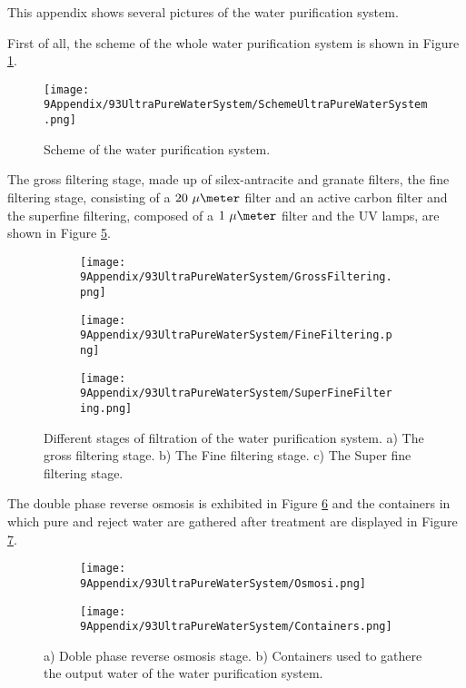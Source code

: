This appendix shows several pictures of the water purification system. 

First of all, the scheme of the whole water purification system is shown in Figure \ref{fig:SchemeUPWS}.

\begin{figure}[htbp]
\centering
\texttt{[image: 9Appendix/93UltraPureWaterSystem/SchemeUltraPureWaterSystem.png]}
\caption{Scheme of the water purification system.\label{fig:SchemeUPWS}}
\end{figure}

The gross filtering stage, made up of silex-antracite and granate filters, the fine filtering stage, consisting of a $20~\mu\meter$ filter and an active carbon filter and the superfine filtering, composed of a $1~\mu\meter$ filter and the UV lamps, are shown in Figure \ref{fig:UltraPureWaterStages}.

\begin{figure}
\centering
    \begin{subfigure}[b]{0.3\textwidth}
    \centering
    \texttt{[image: 9Appendix/93UltraPureWaterSystem/GrossFiltering.png]}  
    \caption{\label{subfig:GrossFiltering}}
    \end{subfigure}
    \hfill
    \begin{subfigure}[b]{0.3\textwidth}
    \centering
    \texttt{[image: 9Appendix/93UltraPureWaterSystem/FineFiltering.png]}  
    \caption{\label{subfig:FineFiltering}}
    \end{subfigure}
    \hfill
    \begin{subfigure}[b]{0.3\textwidth}
    \centering
    \texttt{[image: 9Appendix/93UltraPureWaterSystem/SuperFineFiltering.png]}  
    \caption{\label{subfig:SuperFineFiltering}}
    \end{subfigure}
 \caption{Different stages of filtration of the water purification system. a) The gross filtering stage. b) The Fine filtering stage. c) The Super fine filtering stage.}
 \label{fig:UltraPureWaterStages}
\end{figure}

The double phase reverse osmosis is exhibited in Figure \ref{subfig:Osmosi} and the containers in which pure and reject water are gathered after treatment are displayed in Figure \ref{subfig:Containers}.

\begin{figure}
\centering
    \begin{subfigure}[b]{0.3\textwidth}
    \centering
    \texttt{[image: 9Appendix/93UltraPureWaterSystem/Osmosi.png]}  
    \caption{\label{subfig:Osmosi}}
    \end{subfigure}
    \hfill
    \begin{subfigure}[b]{0.5\textwidth}
    \centering
    \texttt{[image: 9Appendix/93UltraPureWaterSystem/Containers.png]}  
    \caption{\label{subfig:Containers}}
    \end{subfigure}
 \caption{a) Doble phase reverse osmosis stage. b) Containers used to gathere the output water of the water purification system.}
 \label{subfig:OsmosisContainers}
\end{figure}

